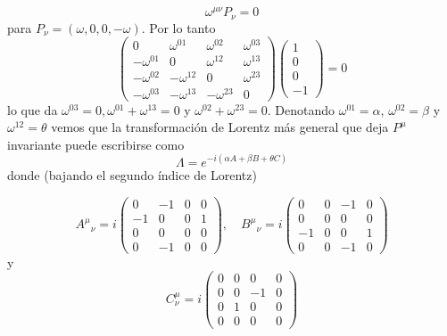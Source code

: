 {  \begin{equation*}
    \omega^{\mu \nu} P_{\nu}=0 \tag{2.118}
    \end{equation*}
    para $P_{\nu}=(\omega, 0,0,-\omega)$. Por lo tanto
    $$
    \left(\begin{array}{cccc}
      0 & \omega^{01} & \omega^{02} & \omega^{03}  \tag{2.119}\\
      -\omega^{01} & 0 & \omega^{12} & \omega^{13} \\
      -\omega^{02} & -\omega^{12} & 0 & \omega^{23} \\
      -\omega^{03} & -\omega^{13} & -\omega^{23} & 0
      \end{array}\right)\left(\begin{array}{c}
      1 \\
      0 \\
      0 \\
      -1
      \end{array}\right)=0$$
      lo que da $\omega^{03}=0, \omega^{01}+\omega^{13}=0$ y $\omega^{02}+\omega^{23}=0$. Denotando $\omega^{01}=\alpha$, $\omega^{02}=\beta$ y $\omega^{12}=\theta$ vemos que la transformación de Lorentz más general que deja $P^{\mu}$ invariante puede escribirse como
      \begin{equation*}
        \Lambda=e^{-i(\alpha A+\beta B+\theta C)} \tag{2.120}
        \end{equation*}
        donde (bajando el segundo índice de Lorentz)

        $$
A^{\mu}{ }_{\nu}=i\left(\begin{array}{cccc}
0 & -1 & 0 & 0  \tag{2.121}\\
-1 & 0 & 0 & 1 \\
0 & 0 & 0 & 0 \\
0 & -1 & 0 & 0
\end{array}\right), \quad B^{\mu}{ }_{\nu}=i\left(\begin{array}{cccc}
0 & 0 & -1 & 0 \\
0 & 0 & 0 & 0 \\
-1 & 0 & 0 & 1 \\
0 & 0 & -1 & 0
\end{array}\right)
$$
y
$$
C_{\nu}^{\mu}=i\left(\begin{array}{cccc}
0 & 0 & 0 & 0  \tag{2.122}\\
0 & 0 & -1 & 0 \\
0 & 1 & 0 & 0 \\
0 & 0 & 0 & 0
\end{array}\right)
$$



}

